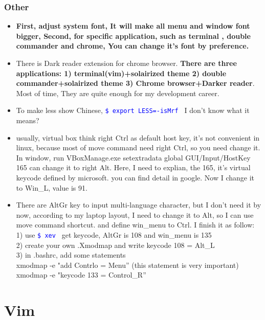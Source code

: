\documentclass[a4paper,12pt,twoside]{book}
\newcommand{\linuxcommand}[1]{\texttt{\textcolor{blue}{\$ #1 \Pisymbol{psy}{191}}}}
\begin{document}
\subsection{Other}
\begin{itemize}
		\item \textbf{First, adjust system font, It will make all menu and window font bigger, Second, for specific application, such as terminal , double commander and chrome, You can change it's font by preference. }

		\item There is Dark reader extension for chrome browser. \textbf{There are three applications: 1) terminal(vim)+solairized theme 2) double commander+solairized theme 3) Chrome browser+Darker reader}. Most of time, They are quite enough for my development career. 

		\item To make less show Chinese, \linuxcommand{export LESS=-isMrf} I don't know what it means?

		\item usually, virtual box think right Ctrl as default host key, it's not convenient in linux, because most of move command need right Ctrl, so you need change it.  In window, run VBoxManage.exe setextradata global GUI/Input/HostKey 165 can change it to right Alt. Here, I need to explian, the 165, it's virtual keycode defined by microsoft. you can find detail in google. Now I change it to Win\_L, value is 91.

		\item There are AltGr key to input multi-language character, but I don't need it by now, according to my laptop layout, I need to change it to Alt, so I can use move command shortcut. and define win\_menu to Ctrl. I finish it as follow: \\
	1) use \linuxcommand{xev} get keycode, AltGr is 108 and win\_menu is 135 \\
	2) create your own .Xmodmap and write keycode 108 = Alt\_L\\
	3) in .bashrc, add some statements\\
	xmodmap -e "add Contrlo = Menu'' (this statement is very important)\\
	xmodmap -e "keycode 133 = Control\_R''\\
	\end{itemize}	

	
\chapter{Vim}
\end{document}
